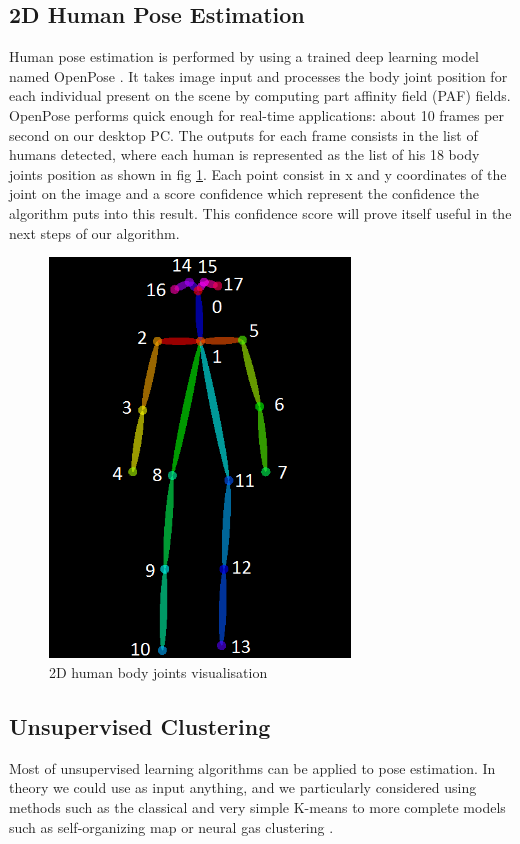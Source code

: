 \subsection{2D Human Pose Estimation}
\label{section:openpose}
Human pose estimation is performed by using a trained deep learning model named OpenPose \cite{Openpose}. It takes image input and processes the body joint position for each individual present on the scene by computing part affinity field (PAF) fields. OpenPose performs quick enough for real-time applications: about 10 frames per second on our desktop PC. The outputs for each frame consists in the list of humans detected, where each human is represented as the list of his 18 body joints position as shown in fig \ref{fig:2D_joints_vis}. Each point consist in x and y coordinates of the joint on the image and a score confidence which represent the confidence the algorithm puts into this result. This confidence score will prove itself useful in the next steps of our algorithm.

\begin{figure}[ht]
    \centering
    \includegraphics[width=80mm, keepaspectratio]{images/2D_body_joints_visualisation.png}
    \caption{2D human body joints visualisation}
    \label{fig:2D_joints_vis}
\end{figure}

\subsection{Unsupervised Clustering}
Most of unsupervised learning algorithms can be applied to pose estimation. In theory we could use as input anything, and we particularly considered using methods such as the classical and very simple K-means \cite{k_means} to more complete models such as self-organizing map \cite{self_organizing_map} or neural gas clustering \cite{neural_gas}.

